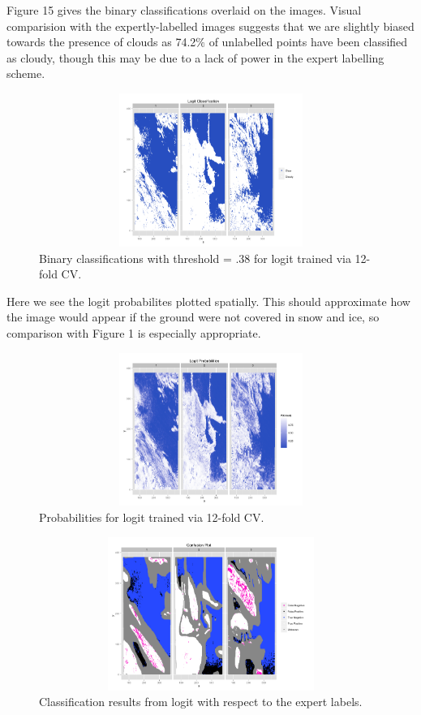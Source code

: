 \documentclass{article}\usepackage[]{graphicx}\usepackage[]{color}
\begin{document}
Figure 15 gives the binary classifications overlaid on the images. Visual comparision with the expertly-labelled images suggests that we are slightly biased towards the presence of clouds as 74.2$\%$ of unlabelled points have been classified as cloudy, though this may be due to a lack of power in the expert labelling scheme.
\begin{figure}[H]
\includegraphics[width = 18cm, height = 5cm]{LogitClassification.png}
\caption{Binary classifications with threshold = .38 for logit trained via 12-fold CV.}
\end{figure}

Here we see the logit probabilites plotted spatially. This should approximate how the image would appear if the ground were not covered in snow and ice, so comparison with Figure 1 is especially appropriate. 
\begin{figure}[H]
\includegraphics[width = 18cm, height = 5cm]{LogitProbabilities.png}
\caption{Probabilities for logit trained via 12-fold CV.}
\end{figure}

\begin{figure}[H]
\includegraphics[width = 18cm, height = 5cm]{ClassificationOutcomes.png}
\caption{Classification results from logit with respect to the expert labels.}
\end{figure}
\end{document}
